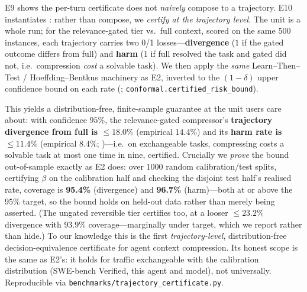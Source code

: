 \documentclass[11pt]{article}
\newcommand{\sweEeightN}{500}\newcommand{\sweEeightSeed}{1729}%
\begin{document}
E9 shows the per-turn certificate does not \emph{naively} compose to a trajectory. E10
instantiates : rather than compose, we \emph{certify at the trajectory
level}. The unit is a whole run; for the relevance-gated tier vs.\ full context, scored on the
same \sweEeightN{} instances, each trajectory carries two 0/1 losses---\textbf{divergence}
($1$ if the gated outcome differs from full) and \textbf{harm} ($1$ if full resolved the
task and gated did not, i.e.\ compression \emph{cost} a solvable task). We then apply the
\emph{same} Learn--Then--Test / Hoeffding--Bentkus machinery as E2, inverted to the
$(1-\delta)$ upper confidence bound on each rate (;
\texttt{conformal.certified\_risk\_bound}).

This yields a distribution-free, finite-sample guarantee at the unit users care about: with
confidence $95\%$, the relevance-gated compressor's \textbf{trajectory divergence from full
is $\le 18.0\%$} (empirical $14.4\%$) and its \textbf{harm rate is $\le 11.4\%$} (empirical
$8.4\%$; )---i.e.\ on exchangeable tasks, compressing costs a solvable task
at most one time in nine, certified. Crucially we \emph{prove} the bound out-of-sample exactly as E2 does: over
$1000$ random calibration/test splits, certifying $\beta$ on the calibration half and
checking the disjoint test half's realised rate, coverage is \textbf{95.4\%} (divergence)
and \textbf{96.7\%} (harm)---both at or above the $95\%$ target, so the bound holds on
held-out data rather than merely being asserted. (The ungated reversible tier certifies
too, at a looser $\le 23.2\%$ divergence with $93.9\%$ coverage---marginally under target,
which we report rather than hide.) To our knowledge this is the first \emph{trajectory-level},
distribution-free decision-equivalence certificate for agent context compression. Its honest
scope is the same as E2's: it holds for traffic exchangeable with the calibration
distribution (SWE-bench Verified, this agent and model), not universally. Reproducible via
\texttt{benchmarks/trajectory\_certificate.py}.
\end{document}
